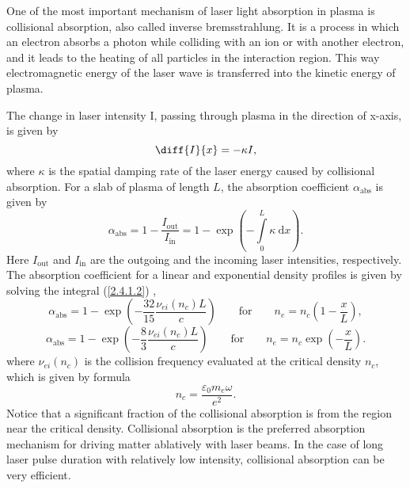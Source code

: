 One of the most important mechanism of laser light absorption in plasma is collisional absorption, also called inverse bremsstrahlung. It is a process in which an electron absorbs a photon while colliding with an ion or with another electron, and it leads to the heating of all particles in the interaction region. This way electromagnetic energy of the laser wave is transferred into the kinetic energy of plasma.

The change in laser intensity I, passing through plasma in the direction of x-axis, is given by
\begin{equation}
\label{2.4.1.1}
\diff{I}{x} = -\kappa I,
\end{equation}
where $ \kappa $ is the spatial damping rate of the laser energy caused by collisional absorption. For a slab of plasma of length $ L $, the absorption coefficient $ \alpha_{\mathrm{abs}} $ is given by
\begin{equation}
\label{2.4.1.2}
\alpha_{\mathrm{abs}} = 1 - \frac{I_{\mathrm{out}}}{I_{\mathrm{in}}} = 1 - \exp \left(-\int\limits_0^L \kappa \: \mathrm{d} x \right).
\end{equation}
Here $ I_{\mathrm{out}} $ and $I_{\mathrm{in}} $ are the outgoing and the incoming laser intensities, respectively. The absorption coefficient for a linear and exponential density profiles is given by solving the integral (\ref{2.4.1.2}) \cite{eliezer},
\begin{equation}
\label{2.4.1.3}
\alpha_{\mathrm{abs}} = 1 - \exp\left(-\frac{32}{15} \frac{\nu_{ei}(n_c) L}{c}\right) \qquad \mathrm{for} \qquad n_e = n_c \left(1 - \frac{x}{L} \right),
\end{equation}
\begin{equation}
\label{2.4.1.4}
\alpha_{\mathrm{abs}} = 1 - \exp\left(-\frac{8}{3} \frac{\nu_{ei}(n_c) L}{c}\right) \qquad \mathrm{for} \qquad n_e = n_c \exp\left(- \frac{x}{L} \right).
\end{equation}
where $ \nu_{ei}(n_c) $ is the collision frequency evaluated at the critical density $ n_c $, which is given by formula
\begin{equation}
n_{c} = \frac{\varepsilon_{0} m_{e} \omega}{e^{2}}.
\end{equation}
Notice that a significant fraction of the collisional absorption is from the region near the critical density. Collisional absorption is the preferred absorption mechanism for driving matter ablatively with laser beams. In the case of long laser pulse duration with relatively low intensity, collisional absorption can be very efficient.